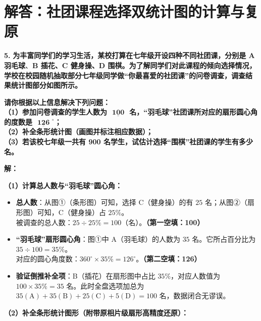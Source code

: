 \newpage



\section{解答：社团课程选择双统计图的计算与复原}

\vspace{0.6cm}

\textbf{\LARGE 5.} \textbf{为丰富同学们的学习生活，某校打算在七年级开设四种不同社团课，分别是 A 羽毛球$、$B 插花、C 健身操、D 围棋。为了解同学们对此课程的倾向选择情况，学校在校园随机抽取部分七年级同学做“你最喜爱的社团课”的问卷调查，调查结果统计图部分如图所示。}

\textbf{请你根据以上信息解决下列问题：\\
（1）参加问卷调查的学生人数为 $\underline{\textbf{    100    }}$ 名，“羽毛球”社团课所对应的扇形圆心角的度数是 $\underline{\textbf{  126  }}^\circ$；\\
（2）补全条形统计图（画图并标注相应数据）；\\
（3）若该校七年级一共有 900 名学生，试估计选择“围棋”社团课的学生有多少名。}

\vspace{0.4cm}
\textbf{解：}

\textbf{（1）计算总人数与“羽毛球”圆心角：}
\begin{itemize}
    \item \textbf{总人数}：从图①（条形图）可知，选择 C（健身操）的有 $25$ 名；从图②（扇形图）可知，C（健身操）占 $25\%$。\\
    被调查的总人数：$25 \div 25\% = 100$（名）。\textbf{（第一空填：100）}
    \item \textbf{“羽毛球”扇形圆心角}：图①中 A（羽毛球）的人数为 $35$ 名。它所占百分比为 $35 \div 100 = 35\%$。\\
    对应的圆心角度数：$360^\circ \times 35\% = 126^\circ$。\textbf{（第二空填：126）}
    \item \textbf{验证倒推补全项}：B（插花）在扇形图中占比 $35\%$，对应人数值为 $100 \times 35\% = 35$ 名。此时全盘选项加总为 $35(\text{A}) + 35(\text{B}) + 25(\text{C}) + 5(\text{D}) = 100$ 名，数据闭合无谬误。
\end{itemize}

\textbf{（2）补全条形统计图形（附带原相片级扇形高精度还原）：}

